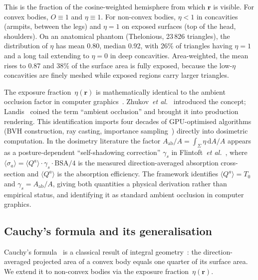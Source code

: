 \documentclass[11pt,a4paper]{article}
\theoremstyle{definition}      %
\newcommand{\rr}{\mathbf{r}}
\newcommand{\Aab}{A_{\mathrm{ab}}}
\newcommand{\diff}{\mathrm{d}}        %
\begin{document}
This is the fraction of the cosine-weighted hemisphere from which
$\rr$ is visible.  For convex bodies, $O\equiv 1$ and $\eta\equiv 1$.
For non-convex bodies, $\eta<1$ in concavities (armpits, between the
legs) and $\eta=1$ on exposed surfaces (top of the head, shoulders).
On an anatomical phantom (Thelonious, 23\,826 triangles), the
distribution of $\eta$ has mean 0.80, median 0.92, with 26\% of
triangles having $\eta=1$ and a long tail extending to $\eta=0$ in
deep concavities.  Area-weighted, the mean rises to 0.87 and 38\% of
the surface area is fully exposed, because the low-$\eta$ concavities
are finely meshed while exposed regions carry larger triangles.

The exposure fraction~$\eta(\rr)$ is mathematically identical to the
ambient occlusion factor in computer
graphics~\cite{Zhukov1998}.  Zhukov~\textit{et al.}~\cite{Zhukov1998}
introduced the concept; Landis~\cite{Landis2002} coined the term
``ambient occlusion'' and brought it into production rendering.
This identification imports four decades of GPU-optimised algorithms
(BVH construction, ray casting, importance
sampling~\cite{Pharr2016,AkenineMoller2018}) directly into dosimetric
computation.
In the dosimetry literature the factor $\Aab/A = \int_\Sigma\eta\,\diff A/A$
appears as a posture-dependent ``self-shadowing correction'' $\gamma_s$
in Flintoft~\textit{et al.}~\cite{Flintoft2014},
where $\langle\sigma_a\rangle = \langle Q^a\rangle\cdot\gamma_s\cdot\mathrm{BSA}/4$
is the measured direction-averaged absorption cross-section and
$\langle Q^a\rangle$ is the absorption efficiency.
The framework identifies $\langle Q^a\rangle = T_0$ and
$\gamma_s = \Aab/A$, giving both quantities a physical derivation rather than
empirical status, and identifying it as standard ambient occlusion in computer graphics.

\subsection{Cauchy's formula and its generalisation}\label{sec:cauchy}

Cauchy's formula~\cite{Cauchy1841} is a classical result of integral
geometry~\cite{Hadwiger1957,SchneiderWeil2008}: the direction-averaged
projected area of a convex body equals one quarter of its surface area.
We extend it to non-convex bodies via the exposure
fraction~$\eta(\rr)$.
\end{document}
